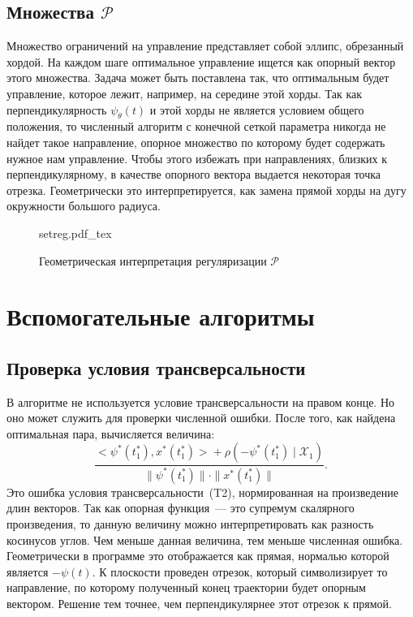 \documentclass[12pt, a4paper]{article} %
\newcommand{\incfig}[1]{%
    \def\svgwidth{\columnwidth}
    {#1.pdf_tex}
}
\newcommand{\inner}[2]{\bigl< #1, #2 \bigr>}
\begin{document}
\subsection{Множества $\mathcal{P}$}

Множество ограничений на управление представляет собой эллипс, обрезанный хордой.
На каждом шаге оптимальное управление ищется как опорный вектор этого множества.
Задача может быть поставлена так, что оптимальным будет управление, которое 
лежит, например, на середине этой хорды.
Так как перпендикулярность $\psi_\theta(t)$ и этой хорды не является 
условием общего положения, то численный алгоритм с конечной сеткой параметра 
никогда не найдет такое направление, опорное множество по которому будет 
содержать нужное нам управление.
Чтобы этого избежать при направлениях, близких к перпендикулярному,
в качестве опорного вектора выдается некоторая точка отрезка.
Геометрически это интерпретируется, как замена прямой хорды на дугу окружности большого радиуса.

\begin{figure}[t]
    \centering
    \incfig{setreg}
    \caption{Геометрическая интерпретация регуляризации $\mathcal{P}$}
    \label{fig:setreg}
\end{figure}

\section{Вспомогательные алгоритмы}

\subsection{Проверка условия трансверсальности}

В алгоритме не используется условие трансверсальности на правом конце.
Но оно может служить для проверки численной ошибки.
После того, как найдена оптимальная пара, вычисляется величина:
\[
    \frac{\inner{\psi^*(t_1^*)}{x^*(t_1^*)} + 
        \rho \left(-\psi^*(t_1^{*}) \mid \mathcal{X}_1 \right)}{
        \|\psi^{*}(t_1^{*}) \| \cdot \| x^{*}(t_1^{*}) \|
    }
.\] 
Это ошибка условия трансверсальности~(T2), нормированная на произведение длин векторов.
Так как опорная функция~--- это супремум скалярного произведения, 
то данную величину можно интерпретировать как разность косинусов углов.
Чем меньше данная величина, тем меньше численная ошибка.
Геометрически в программе это отображается как прямая, нормалью которой 
является $-\psi(t)$.
К плоскости проведен отрезок, который символизирует то направление, 
по которому полученный конец траектории будет опорным вектором.
Решение тем точнее, чем перпендикулярнее этот отрезок к прямой.
\end{document}
